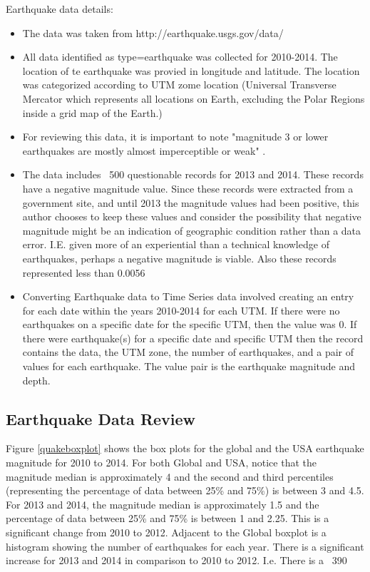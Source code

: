 \documentclass{article}
\begin{document}
Earthquake data details:
\begin{itemize}
\item The data was taken from http://earthquake.usgs.gov/data/
\item All data identified as type=earthquake  was collected for 2010-2014. The location of te earthquake was provied in longitude and latitude. The location was  categorized according to UTM zome location (Universal Transverse Mercator which represents all locations on Earth, excluding the Polar Regions inside a grid map of the Earth.)
\item For reviewing this data, it is important to note "magnitude 3 or lower earthquakes are mostly almost imperceptible or weak" \cite{WE1}.
\item The data includes  ~500 questionable records for 2013 and 2014. These records have a negative magnitude value. Since these records were extracted from a government site, and until 2013 the magnitude values had been positive, this author chooses to keep these values and consider the possibility that negative magnitude might be an indication of geographic condition rather than a data error.  I.E. given more of an experiential than a technical knowledge of earthquakes, perhaps a negative magnitude is viable.  Also these records represented less than 0.0056%
\item  Converting Earthquake data to Time Series data involved creating an entry for each date within the years 2010-2014 for each UTM.  If there were no earthquakes on a specific date for the specific UTM, then the value was 0. If there were earthquake(s) for a specific date and specific UTM then the record contains the data, the UTM zone, the number of earthquakes, and a pair of values for each earthquake.  The value pair is the earthquake magnitude and depth.

\end{itemize}

\subsection{Earthquake Data Review}

Figure \ref{quakeboxplot} shows the box plots for the global and the USA earthquake magnitude for 2010 to 2014.  For both Global and USA, notice that the magnitude median is approximately 4 and the second and third percentiles (representing the percentage of data between 25\% and 75\%) is between 3 and 4.5.
For 2013 and 2014, the magnitude median is approximately 1.5 and the percentage of data between 25\% and 75\% is between 1 and 2.25.  This is a significant change from 2010 to 2012. 
Adjacent to the Global boxplot is a histogram showing the number of earthquakes for each year. There is a significant increase for 2013 and 2014 in comparison to 2010 to 2012.
I.e. There is a  ~390%
\end{document}

